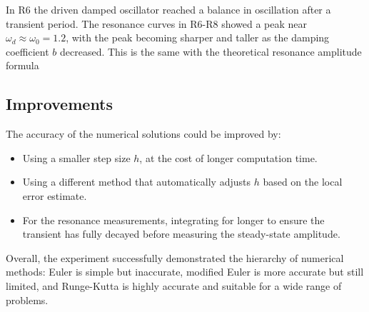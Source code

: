 \documentclass[12pt,a4paper]{article}
\begin{document}
	In R6 the driven damped oscillator reached a balance in oscillation after a transient period. The resonance curves in R6-R8 showed a  peak near \(\omega_d \approx \omega_0 = 1.2\), with the peak becoming sharper and taller as the damping coefficient \(b\) decreased. This is the same with the theoretical resonance amplitude formula
	
	\subsection*{Improvements}
	The accuracy of the numerical solutions could be improved by:
	\begin{itemize}
		\item Using a smaller step size \(h\), at the cost of longer computation time.
		\item Using a different method that automatically adjusts \(h\) based on the local error estimate.
		\item For the resonance measurements, integrating for longer to ensure the transient has fully decayed before measuring the steady-state amplitude.
	\end{itemize}
	
	Overall, the experiment successfully demonstrated the hierarchy of numerical methods: Euler is simple but inaccurate, modified Euler is more accurate but still limited, and Runge-Kutta is highly accurate and suitable for a wide range of problems.
	
\end{document}
